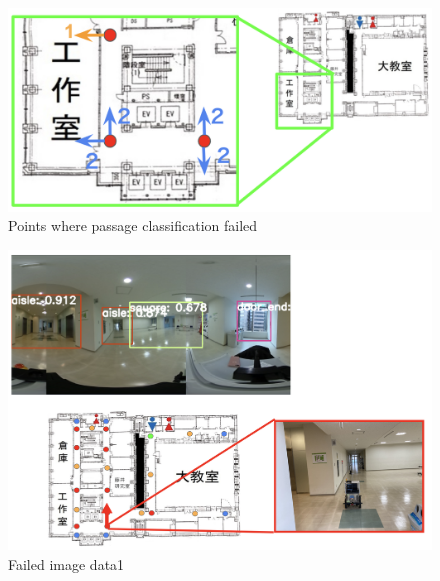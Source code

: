 \documentclass[../main]{subfiles}
\begin{document}
        \begin{figure}[H]
            \centering
            \includegraphics[scale=0.5]{../images/experiment_result.png}
            \caption{Points where passage classification failed}
            \label{figure::experiment_result}
        \end{figure}

        \begin{figure}[H]
            \centering
            \includegraphics[scale=0.5]{../images/experiment_failed1.png}
            \caption{Failed image data1}
            \label{figure::experiment_failed1}
        \end{figure}
             
\end{document}
